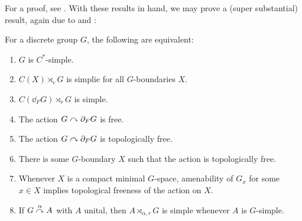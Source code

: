 For a proof, see \cite[lemma 11]{ozawa2014lecture}. With these results in hand, we may prove a (super substantial) result, again due to \cite{breuillard2017c} and \cite{kalantar2017boundaries}:
\begin{theorem}
	For a discrete group $G$, the following are equivalent:
\begin{enumerate}
		\item $G$ is $C^*$-simple.
		\item $C(X) \rtimes_r G$ is simplie for all $G$-boundaries $X$.
		\item $C(\dd_F G) \rtimes_r G$ is simple.
		\item The action $G \stackrel{}{\curvearrowright} \partial_F G$ is free.
		\item The action $G \stackrel{}{\curvearrowright} \partial_F G$ is topologically free.
		\item There is some $G$-boundary $X$ such that the action is topologically free.
		\item Whenever $X$ is a compact minimal $G$-space, amenability of $G_x$ for some $x \in X$ implies topological freeness of the action on $X$.
		\item If $G \stackrel{\alpha}{\curvearrowright} A$ with $A$ unital, then $A \rtimes_{\alpha,r} G$ is simple whenever $A$ is $G$-simple.
	\end{enumerate}
	\label{breulcsimple}
\end{theorem}
